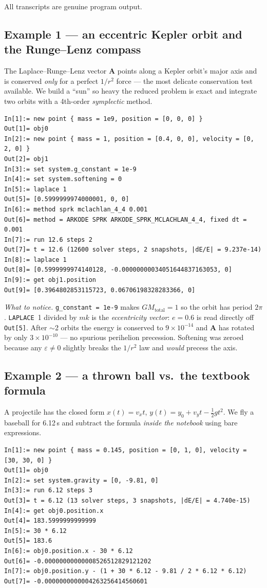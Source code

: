 \documentclass[11pt]{article}
\newcommand{\kw}[1]{\texttt{\uppercase{#1}}}
\newcommand{\code}[1]{\texttt{#1}}
\begin{document}
All transcripts are genuine program output.

\subsection{Example 1 --- an eccentric Kepler orbit and the Runge--Lenz compass}

The Laplace--Runge--Lenz vector $\mathbf A$ points along a Kepler
orbit's major axis and is conserved \emph{only} for a perfect $1/r^2$
force --- the most delicate conservation test available. We build a
``sun'' so heavy the reduced problem is exact and integrate two orbits
with a 4th-order \emph{symplectic} method.

\begin{lstlisting}
In[1]:= new point { mass = 1e9, position = [0, 0, 0] }
Out[1]= obj0
In[2]:= new point { mass = 1, position = [0.4, 0, 0], velocity = [0, 2, 0] }
Out[2]= obj1
In[3]:= set system.g_constant = 1e-9
In[4]:= set system.softening = 0
In[5]:= laplace 1
Out[5]= [0.5999999974000001, 0, 0]
In[6]:= method sprk mclachlan_4_4 0.001
Out[6]= method = ARKODE SPRK ARKODE_SPRK_MCLACHLAN_4_4, fixed dt = 0.001
In[7]:= run 12.6 steps 2
Out[7]= t = 12.6 (12600 solver steps, 2 snapshots, |dE/E| = 9.237e-14)
In[8]:= laplace 1
Out[8]= [0.5999999974140128, -0.00000000034051644837163053, 0]
In[9]:= get obj1.position
Out[9]= [0.3964802853115723, 0.06706198328283366, 0]
\end{lstlisting}

\emph{What to notice.} \code{g\_constant = 1e-9} makes
$G M_{\text{total}} = 1$ so the orbit has period $2\pi$. \kw{laplace}~1
divided by $mk$ is the \emph{eccentricity vector}: $e = 0.6$ is read
directly off \code{Out[5]}. After $\sim$2 orbits the energy is conserved
to $9\times10^{-14}$ and $\mathbf A$ has rotated by only
$3\times10^{-10}$ --- no spurious perihelion precession. Softening was
zeroed because any $\varepsilon\ne 0$ slightly breaks the $1/r^2$ law
and \emph{would} precess the axis.

\subsection{Example 2 --- a thrown ball vs.\ the textbook formula}

A projectile has the closed form $x(t)=v_x t$,
$y(t)=y_0+v_y t-\tfrac12 g t^2$. We fly a baseball for 6.12\,s and
subtract the formula \emph{inside the notebook} using bare expressions.

\begin{lstlisting}
In[1]:= new point { mass = 0.145, position = [0, 1, 0], velocity = [30, 30, 0] }
Out[1]= obj0
In[2]:= set system.gravity = [0, -9.81, 0]
In[3]:= run 6.12 steps 3
Out[3]= t = 6.12 (13 solver steps, 3 snapshots, |dE/E| = 4.740e-15)
In[4]:= get obj0.position.x
Out[4]= 183.5999999999999
In[5]:= 30 * 6.12
Out[5]= 183.6
In[6]:= obj0.position.x - 30 * 6.12
Out[6]= -0.00000000000008526512829121202
In[7]:= obj0.position.y - (1 + 30 * 6.12 - 9.81 / 2 * 6.12 * 6.12)
Out[7]= -0.0000000000004263256414560601
\end{lstlisting}
\end{document}
